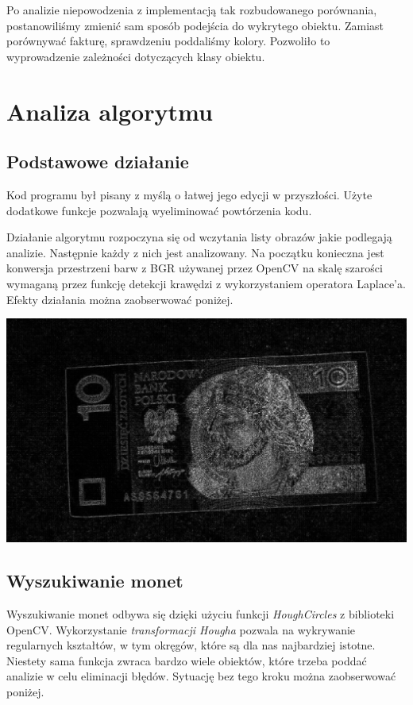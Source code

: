 \documentclass{mwart}
\begin{document}
Po analizie niepowodzenia z implementacją tak rozbudowanego porównania, postanowiliśmy zmienić sam sposób podejścia do wykrytego obiektu. Zamiast porównywać fakturę, sprawdzeniu poddaliśmy kolory. Pozwoliło to wyprowadzenie zależności dotyczących klasy obiektu.

\section{Analiza algorytmu}
\subsection{Podstawowe działanie}
Kod programu był pisany z myślą o łatwej jego edycji w przyszłości. Użyte dodatkowe funkcje pozwalają wyeliminować powtórzenia kodu.

Działanie algorytmu rozpoczyna się od wczytania listy obrazów jakie podlegają analizie. Następnie każdy z nich jest analizowany. Na początku konieczna jest konwersja przestrzeni barw z BGR używanej przez OpenCV na skalę szarości wymaganą przez funkcję detekcji krawędzi z wykorzystaniem operatora Laplace’a. Efekty działania można zaobserwować poniżej.

\begin{center}
    \includegraphics[width=\textwidth]{Laplacian.png}
\end{center}

\subsection{Wyszukiwanie monet}

Wyszukiwanie monet odbywa się dzięki użyciu funkcji \textit{HoughCircles} z biblioteki OpenCV. Wykorzystanie \textit{transformacji Hougha} pozwala na wykrywanie regularnych kształtów, w tym okręgów, które są dla nas najbardziej istotne.
Niestety sama funkcja zwraca bardzo wiele obiektów, które trzeba poddać analizie w celu eliminacji błędów. Sytuację bez tego kroku można zaobserwować poniżej.
\end{document}

